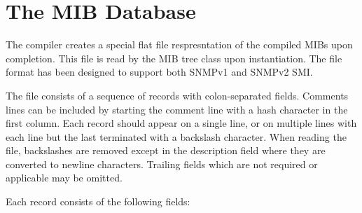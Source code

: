 

\section{The MIB Database}

The compiler creates a special flat file respresntation of the compiled
MIBs upon completion. This file is read by the MIB tree class upon 
instantiation. The file format has been designed to support both 
SNMPv1 and SNMPv2 SMI.

The file consists of a sequence of records with colon-separated fields.
Comments lines can be included by starting the comment line with a hash
character in the first column. Each record should appear on a single line,
or on multiple lines with each line but the last terminated with a 
backslash character. When reading the file, backslashes are removed
except in the description field where they are converted to newline
characters. Trailing fields which are not required or applicable
may be omitted.

Each record consists of the following fields:

